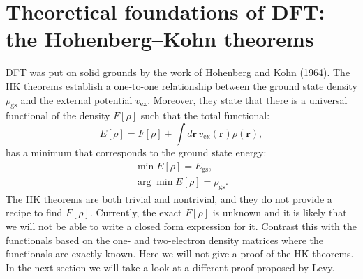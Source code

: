 \documentclass[../Main/chem532-notes.tex]{subfiles}
\begin{document}
\section{Theoretical foundations of DFT: the Hohenberg--Kohn theorems}
DFT was put on solid grounds by the work of Hohenberg and Kohn (1964).
The HK theorems establish a one-to-one relationship between the ground state density $\rho_\mathrm{gs}$ and the external potential $v_\mathrm{ex}$.
Moreover, they state that there is a universal functional of the density $F[\rho]$ such that the total functional:
\begin{equation}
E[\rho] = F[\rho] + \int d\mathbf{r} \, v_\mathrm{ex}(\mathbf{r}) \rho(\mathbf{r}),
\end{equation}
has a minimum that corresponds to the ground state energy:
\begin{align} 
\min E[\rho] = E_\mathrm{gs}, \label{eq:dft:hktheorem2a}\\
\arg \min E[\rho] = \rho_\mathrm{gs} \label{eq:dft:hktheorem2b}.
\end{align}
The HK theorems are both trivial and nontrivial, and they do not provide a recipe to find $F[\rho]$.
Currently, the exact $F[\rho]$ is unknown and it is likely that we will not be able to write a closed form expression for it.
Contrast this with the functionals based on the one- and two-electron density matrices where the functionals are exactly known.
Here we will not give a proof of the HK theorems. In the next section we will take a look at a different proof proposed by Levy.
\end{document}
